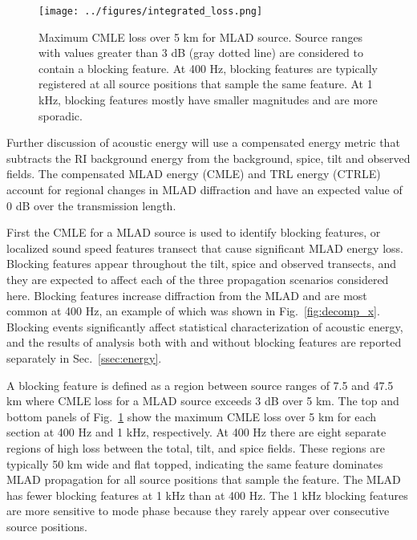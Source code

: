 \documentclass[preprint,NumberedRefs]{JASA}
\begin{document}
\begin{figure}
\texttt{[image: ../figures/integrated\_loss.png]}
    \caption{Maximum CMLE loss over 5 km for MLAD source. Source ranges with values greater than 3 dB (gray dotted line) are considered to contain a blocking feature. At 400 Hz, blocking features are typically registered at all source positions that sample the same feature. At 1 kHz, blocking features mostly have smaller magnitudes and are more sporadic.}
    \label{fig:blocking}
\end{figure}
Further discussion of acoustic energy will use a compensated energy metric that subtracts the RI background energy from the background, spice, tilt and observed fields. The compensated MLAD energy (CMLE) and TRL energy (CTRLE) account for regional changes in MLAD diffraction and have an expected value of 0 dB over the transmission length.

First the CMLE for a MLAD source is used to identify blocking features, or localized sound speed features transect that cause significant MLAD energy loss. Blocking features appear throughout the tilt, spice and observed transects, and they are expected to affect each of the three propagation scenarios considered here. Blocking features increase diffraction from the MLAD and are most common at 400 Hz, an example of which was shown in Fig.~\ref{fig:decomp_x}. Blocking events significantly affect statistical characterization of acoustic energy, and the results of analysis both with and without blocking features are reported separately in Sec.~\ref{ssec:energy}.

A blocking feature is defined as a region between source ranges of 7.5 and 47.5 km where CMLE loss for a MLAD source exceeds 3 dB over 5 km. The top and bottom panels of Fig.~\ref{fig:blocking} show the maximum CMLE loss over 5 km for each section at 400 Hz and 1 kHz, respectively. At 400 Hz there are eight separate regions of high loss between the total, tilt, and spice fields. These regions are typically 50 km wide and flat topped, indicating the same feature dominates MLAD propagation for all source positions that sample the feature. The MLAD has fewer blocking features at 1 kHz than at 400 Hz. The 1 kHz blocking features are more sensitive to mode phase because they rarely appear over consecutive source positions.
\end{document}
